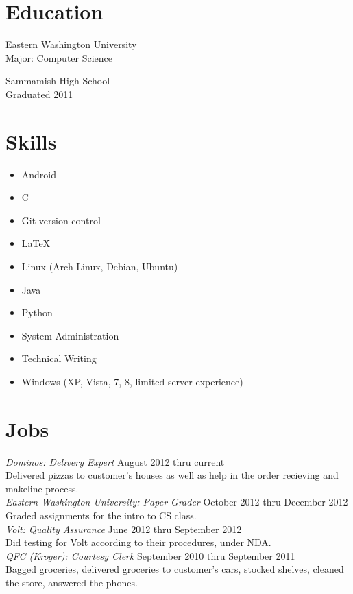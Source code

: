 \documentclass[line, margin, 10pt]{res}
\begin{document}
\address{12924 SE 26th ST \\ Bellevue WA, 98005 \\ +1 (425) 221-7761}
     
\begin{resume}
\section{Education}
Eastern Washington University \\
Major: Computer Science

Sammamish High School \\
Graduated 2011
     
\section{Skills}
\begin{itemize}
\item Android 
\item C
\item Git version control
\item \LaTeX
\item Linux (Arch Linux, Debian, Ubuntu)
\item Java
\item Python
\item System Administration
\item Technical Writing
\item Windows (XP, Vista, 7, 8, limited server experience)
\end{itemize}
     
\section{Jobs}
\textit{Dominos: Delivery Expert} \hfill August 2012 thru current \\
Delivered pizzas to customer's houses as well as help in the order
recieving and makeline process. \\ [10pt]
\textit{Eastern Washington University: Paper Grader} \hfill October 2012 thru December 2012 \\
Graded assignments for the intro to CS class. \\ [10pt]
\textit{Volt: Quality Assurance} \hfill June 2012 thru September 2012 \\
Did testing for Volt according to their procedures, under NDA. \\ [10pt]
\textit{QFC (Kroger): Courtesy Clerk} \hfill September 2010 thru September 2011 \\
Bagged groceries, delivered groceries to customer's cars, stocked
shelves, cleaned the store, answered the phones. \\ [10pt]


\end{resume}
\end{document}
